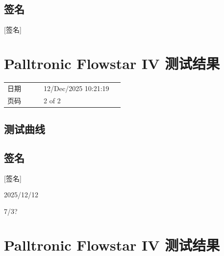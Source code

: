 \documentclass[UTF8,10pt,a4paper,fontset=fandol]{ctexart}
\newcommand{\fieldvalue}[1]{#1}
\newcommand{\handwritten}[1]{#1}
\begin{document}
\subsection{签名}

\fieldvalue{\handwritten{[签名]}}

\bigskip

\section{Palltronic Flowstar IV 测试结果}

\begin{tabular}{@{}p{0.28\linewidth}p{0.62\linewidth}@{}}
日期 &
\fieldvalue{12/Dec/2025 10:21:19}
\\
页码 &
\fieldvalue{2 of 2}
\end{tabular}

\subsection{测试曲线}

\begin{center}
\end{center}

\subsection{签名}

\fieldvalue{\handwritten{[签名]}}

\handwritten{2025/12/12}

\handwritten{7/3?}

\newpage

\section{Palltronic Flowstar IV 测试结果}
\end{document}
